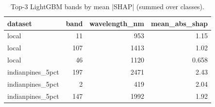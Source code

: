\begin{table}
\caption{Top-3 LightGBM bands by mean |SHAP| (summed over classes).}
\label{tab:shap_top_bands}
\begin{tabular}{lrrr}
\toprule
dataset & band & wavelength\_nm & mean\_abs\_shap \\
\midrule
local & 11 & 953 & 1.15 \\
local & 107 & 1413 & 1.02 \\
local & 46 & 1120 & 0.658 \\
indianpines\_5pct & 197 & 2471 & 2.43 \\
indianpines\_5pct & 2 & 419 & 2.04 \\
indianpines\_5pct & 147 & 1992 & 1.92 \\
\bottomrule
\end{tabular}
\end{table}
